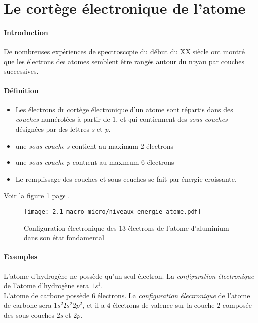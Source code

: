 \section{Le cortège électronique de l'atome}
\paragraph{Introduction} De nombreuses expériences de spectroscopie du début du XX\ieme{} siècle
ont montré que les électrons des atomes semblent être rangés autour du noyau par couches successives.

\paragraph{Définition} 
\begin{itemize}
 \item Les électrons du cortège électronique d'un atome sont répartis dans des
    \textit{couches} numérotées à partir de $1$, et qui contiennent des \textit{sous couches}
    désignées par des lettres \textit{s} et  \textit{p}.
 \item une \textit{sous couche s} contient au maximum $2$ électrons
 \item une \textit{sous couche p} contient au maximum $6$ électrons
 \item Le remplissage des couches et sous couches se fait par énergie croissante.  
\end{itemize}
Voir la figure \ref{fig:config_electronique} page \pageref{fig:config_electronique}.
\begin{figure}[!h]
    \begin{center}
	\texttt{[image: 2.1-macro-micro/niveaux\_energie\_atome.pdf]}
    \end{center}
    \caption{Configuration électronique des $13$ électrons de l'atome 
    d'aluminium dans son état fondamental}
    \label{fig:config_electronique}
\end{figure}

\paragraph{Exemples} L'atome d'hydrogène ne possède qu'un seul électron. La
\textit{configuration électronique} de l'atome d'hydrogène sera $1s^{1}$.\\
L'atome de carbone possède $6$ électrons. La \textit{configuration électronique} 
de l'atome de carbone sera $1s^2 2s^2 2p^2$, et il a $4$ électrons de valence sur la
couche $2$ composée des sous couches $2s$ et $2p$.\\

